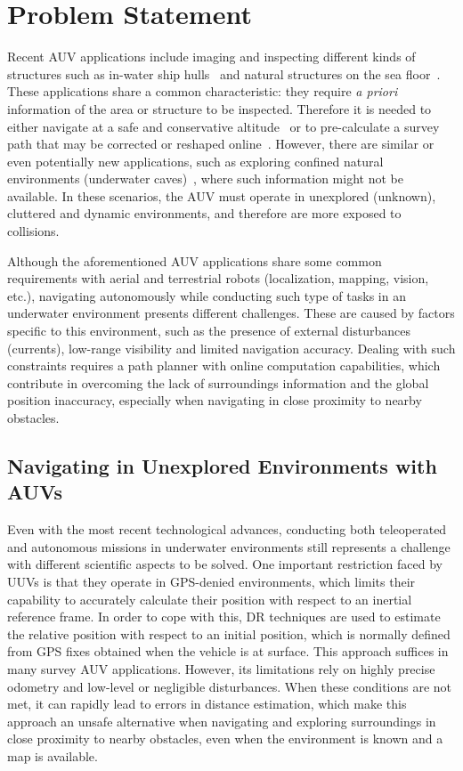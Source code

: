 \section{Problem Statement}

Recent \ac{AUV} applications include imaging and inspecting different kinds of
structures such as in-water ship hulls~\cite{Hover2012,Hurtos2015} and natural
structures on the sea floor~\cite{Galceran2014b}. These applications share a
common characteristic: they require \textit{a priori} information of the area or
structure to be inspected. Therefore it is needed to either navigate at a safe
and conservative altitude~\cite{Grasmueck2006,Bingham2010} or to pre-calculate a
survey path that may be corrected or reshaped
online~\cite{Hover2012,Galceran2014b}. However, there are similar or even
potentially new applications, such as exploring confined natural environments
(\eg underwater caves)~\cite{Mallios2015}, where such information might not be
available. In these scenarios, the \ac{AUV} must operate in unexplored
(unknown), cluttered and dynamic environments, and therefore are more exposed to
collisions.

Although the aforementioned \ac{AUV} applications share some common requirements
with aerial and terrestrial robots (\eg localization, mapping, vision, etc.),
navigating autonomously while conducting such type of tasks in an underwater
environment presents different challenges. These are caused by factors specific
to this environment, such as the presence of external disturbances (currents),
low-range visibility and limited navigation accuracy. Dealing with such
constraints requires a path planner with online computation capabilities, which
contribute in overcoming the lack of surroundings information and the global
position inaccuracy, especially when navigating in close proximity to nearby
obstacles.

\subsection{Navigating in Unexplored Environments with AUVs}

Even with the most recent technological advances, conducting both teleoperated
and autonomous missions in underwater environments still represents a challenge
with different scientific aspects to be solved. One important restriction faced
by \acp{UUV} is that they operate in GPS-denied environments, which limits their
capability to accurately calculate their position with respect to an inertial
reference frame. In order to cope with this, \ac{DR} techniques are used to
estimate the relative position with respect to an initial position, which is
normally defined from GPS fixes obtained when the vehicle is at surface. This
approach suffices in many survey \ac{AUV} applications. However, its limitations
rely on highly precise odometry and low-level or negligible disturbances. When
these conditions are not met, it can rapidly lead to errors in distance
estimation, which make this approach an unsafe alternative when navigating and
exploring surroundings in close proximity to nearby obstacles, even when the
environment is known and a map is available.

